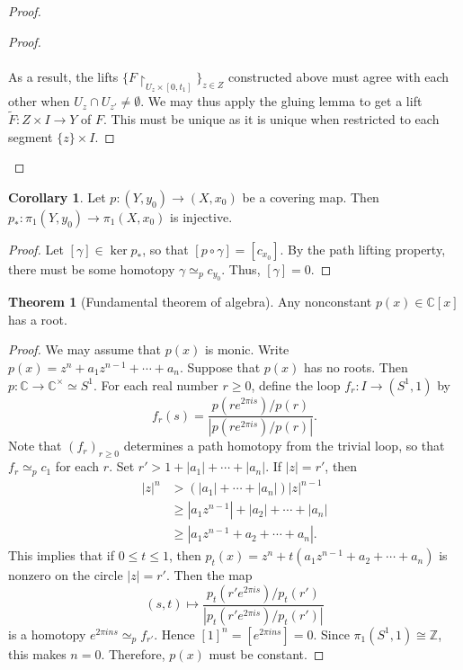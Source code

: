 \documentclass[10pt,letterpaper,cm]{nupset}
\theoremstyle{definition}
\theoremstyle{theorem}
\newtheorem{theorem}[definition]{Theorem}
\newtheorem{corollary}[definition]{Corollary}
\theoremstyle{remark}
\newcommand{\C}{\mathbb C}
\newcommand{\Z}{\mathbb Z}
\newcommand{\1}{\mathbb{1}}
\newcommand{\0}{\vec 0}
\begin{document}
\begin{proof}
\begin{proof}
\\ \\ As a result, the  lifts  $\{F \restriction_{U_{z} \times [0, t_1]}\}_{z\in Z}$ constructed above must agree with each other when $U_z \cap U_{z'} \ne \emptyset$. We may thus apply the gluing lemma to get a lift $\tilde{F} : Z \times I \to Y$ of $F$. This must be unique as it is unique when restricted to each segment $\{z\} \times I$.
\end{proof}
\end{proof}

\begin{corollary}
Let $p: (Y, y_0) \to (X, x_0)$  be a covering map. Then $p_{\ast} : \pi_1(Y, y_0) \to \pi_1(X, x_0)$ is injective. 
\end{corollary}
\begin{proof}
Let $[\gamma] \in \ker{p_{\ast}}$, so that $[p\circ \gamma] = [c_{x_0}]$. By the path lifting property, there must be some homotopy $\gamma \simeq_p c_{y_0}$. Thus, $[\gamma] = 0$.
\end{proof}

\begin{theorem}[Fundamental theorem of algebra]
Any nonconstant $p(x) \in \C[x]$ has a root. 
\end{theorem}
\begin{proof}
We may assume that $p(x)$ is monic. Write $p(x) = z^n + a_{1}z^{n-1} +\cdots + a_n$. Suppose that $p(x)$ has no roots. Then $p : \C \to \C^{\times} \simeq S^1$. For each real number $r\geq 0$, define the loop $f_r : I \to (S^1, 1)$ by $$f_r(s) = \frac{p(re^{2\pi i s})/p(r)}{|p(re^{2\pi i s})/p(r)|}.$$ Note that $(f_r)_{r\geq 0}$ determines a path homotopy from the trivial loop, so that $f_r \simeq_p c_1$ for each $r$. Set $ r' > 1 + |a_1| + \cdots + |a_n|$. If $|z| =r'$, then 
\begin{align*}
 |z|^n & > (|a_1| + \cdots + |a_n|)|z|^{n-1} 
 \\ & \geq |a_1z^{n-1}| + |a_2| + \cdots + |a_n|\\ & \geq |a_1z^{n-1} + a_2 + \cdots + a_n|.
\end{align*}
This implies that if $0\leq t\leq 1$, then $p_t(x) = z^n +t(a_1z^{n-1} + a_2 + \cdots + a_n)$ is nonzero on the circle $|z| =r'$. Then the map $$(s,t) \mapsto \frac{p_t(r'e^{2\pi i s})/p_t(r')}{|p_t(r'e^{2\pi i s})/p_t(r')|}$$ is a homotopy $e^{2\pi i ns} \simeq_p f_{r'}$. Hence $[1]^n = [e^{2\pi i ns} ] = 0$. Since $\pi_1(S^1, 1) \cong \Z$, this makes $n=0$. Therefore, $p(x)$ must be constant. 
\end{proof}
\end{document}
